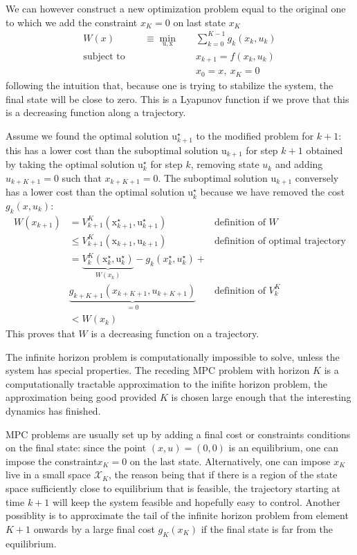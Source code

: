 \documentclass[11pt]{report}
\newcommand{\bs}[1]{\boldsymbol{#1}}
\newcommand{\bsu}{\bs{\mathrm{u}}}
\newcommand{\bsx}{\bs{\mathrm{x}}}
\begin{document}
We can however construct a new optimization problem equal to the original one to which we add the constraint $x_K=0$ on last state $x_K$
\begin{align}
  \label{eq:lyapunov-tracking-MPC}
  W(x) \qquad\quad\equiv \min_{\bsu,\bsx} &\quad \sum_{k=0}^{K-1} g_k(x_k,u_k) \\
  \text{subject to } &\quad x_{k+1} = f(x_k,u_k) \\
  &\quad  x_0 = x,\ x_K = 0
\end{align}
following the intuition that, because one is trying to stabilize the system, the final state will be close to zero. This is a Lyapunov function if we prove that this is a decreasing function along a trajectory.

Assume we found the optimal solution $\bsu_{k+1}^\star$ to the modified problem for $k+1$: this has a lower cost than the suboptimal solution $\bsu_{k+1}$ for step $k+1$ obtained by taking the optimal solution $\bsu_k^\star$ for step $k$, removing state $u_k$ and adding $u_{k+K+1} = 0$ such that $x_{k+K+1} = 0$. The suboptimal solution $\bsu_{k+1}$ conversely has a lower cost than the optimal solution $\bsu_k^\star$ because we have removed the cost $g_k(x,u_k)$:
\begin{align*}
  W(x_{k+1}) &= V_{k+1}^K(\bsx_{k+1}^\star, \bsu_{k+1}^\star) & \text{definition of $W$} \\
             & \leq V_{k+1}^K(\bsx_{k+1}, \bsu_{k+1}) & \text{definition of optimal trajectory} \\
             & = \underbrace{V_k^K(\bsx_k^\star, \bsu_k^\star)}_{W(x_k)} - g_k(x_k^\star,u_k^\star) + \\
             & \underbrace{g_{k+K+1}(x_{k+K+1},u_{k+K+1})}_{=0} & \text{definition of $V_k^K$} \\
  & < W(x_k)
\end{align*}
This proves that $W$ is a decreasing function on a trajectory.

The infinite horizon problem is computationally impossible to solve, unless the system has special properties. The receding MPC problem with horizon $K$ is a computationally tractable approximation to the inifite horizon problem, the approximation being good provided $K$ is chosen large enough that the interesting dynamics has finished.

MPC problems are usually set up by adding a final cost or constraints conditions on the final state: since the point $(x,u)=(0,0)$ is an equilibrium, one can impose the constraint$x_K=0$ on the last state. Alternatively, one can impose $x_K$ live in a small space $\mathcal{X}_K$, the reason being that if there is a region of the state space sufficiently close to equilibrium that is feasible, the trajectory starting at time $k+1$ will keep the system feasible and hopefully easy to control. Another possiblity is to approximate the tail of the infinite horizon problem from element $K+1$ onwards by a large final cost $g_K(x_K)$ if the final state is far from the equilibrium.
\end{document}
